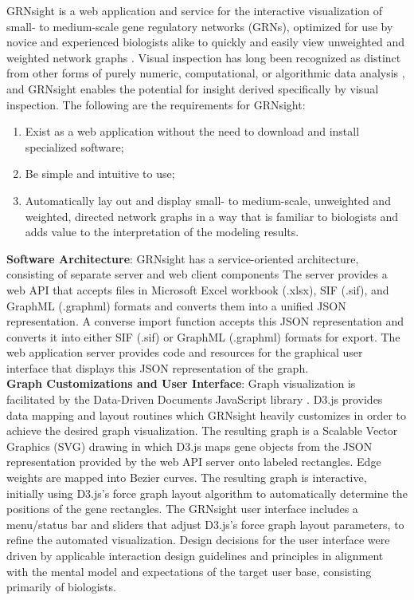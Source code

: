 \documentclass[sigconf,review]{acmart}
\begin{document}
GRNsight is a web application and service for the interactive visualization of small- to medium-scale 
gene regulatory networks (GRNs), optimized for use by novice and experienced biologists alike to quickly 
and easily view unweighted and weighted network graphs \cite{peerj}. Visual inspection has long been 
recognized as distinct from other forms of purely numeric, computational, or algorithmic data analysis 
\cite{Tufte:1986:VDQ:33404, card1999readings}, and GRNsight enables the potential for insight derived 
specifically by visual inspection. The following are the requirements for GRNsight:

\begin{enumerate}
\item Exist as a web application without the need to download and install specialized software;
\item Be simple and intuitive to use;
\item Automatically lay out and display small- to medium-scale, unweighted and weighted, directed 
network graphs in a way that is familiar to biologists and adds value to the interpretation of the 
modeling results.
\end{enumerate} 

\textbf{Software Architecture}: GRNsight has a service-oriented architecture, consisting of separate 
server and web client components The server provides a web API that accepts files in Microsoft Excel 
workbook (.xlsx), SIF (.sif), and GraphML (.graphml) formats and converts them into a unified JSON 
representation. A converse import function accepts this JSON representation and converts it into either 
SIF (.sif) or GraphML (.graphml) formats for export. The web application server provides code and 
resources for the graphical user interface that displays this JSON representation of the graph.\\

\textbf{Graph Customizations and User Interface}: Graph visualization is facilitated by the Data-Driven 
Documents JavaScript library \cite{d3}. D3.js provides data mapping and layout routines which GRNsight 
heavily customizes in order to achieve the desired graph visualization. The resulting graph is a 
Scalable Vector Graphics (SVG) drawing in which D3.js maps gene objects from the JSON representation 
provided by the web API server onto labeled rectangles. Edge weights are mapped into Bezier curves. The 
resulting graph is interactive, initially using D3.js's force graph layout algorithm to automatically 
determine the positions of the gene rectangles. The GRNsight user interface includes a menu/status bar 
and sliders that adjust D3.js's force graph layout parameters, to refine the automated visualization. 
Design decisions for the user interface were driven by applicable interaction design guidelines and 
principles \cite{norman2013design,shneiderman2010designing,nielsen1994usability} in alignment with the 
mental model and expectations of the target user base, consisting primarily of biologists.
\end{document}
